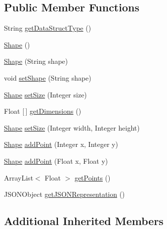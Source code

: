 \subsection*{Public Member Functions}
\begin{DoxyCompactItemize}
\item 
String \mbox{\hyperlink{classbridges_1_1base_1_1_shape_afedfd8c18cee9c257e97e674a7ee7280}{get\+Data\+Struct\+Type}} ()
\item 
\mbox{\hyperlink{classbridges_1_1base_1_1_shape_a36804934a06136baac463c026ad5ecfb}{Shape}} ()
\item 
\mbox{\hyperlink{classbridges_1_1base_1_1_shape_aede6772e9d9cb1b1c520a262d8fa53ed}{Shape}} (String shape)
\item 
void \mbox{\hyperlink{classbridges_1_1base_1_1_shape_aee070bfb54f51f7fe492f8a42ca6c052}{set\+Shape}} (String shape)
\item 
\mbox{\hyperlink{classbridges_1_1base_1_1_shape}{Shape}} \mbox{\hyperlink{classbridges_1_1base_1_1_shape_a0dcc8e3f9744b6b33da311fb477b7b9b}{set\+Size}} (Integer size)
\item 
Float \mbox{[}$\,$\mbox{]} \mbox{\hyperlink{classbridges_1_1base_1_1_shape_a1517f577eb32f162ddb0192e7bf3de9e}{get\+Dimensions}} ()
\item 
\mbox{\hyperlink{classbridges_1_1base_1_1_shape}{Shape}} \mbox{\hyperlink{classbridges_1_1base_1_1_shape_ac3a5ab9d24a4ee87b5a5b4c7a96f0f3e}{set\+Size}} (Integer width, Integer height)
\item 
\mbox{\hyperlink{classbridges_1_1base_1_1_shape}{Shape}} \mbox{\hyperlink{classbridges_1_1base_1_1_shape_afe4a23eae49cf672bd38601b013c1050}{add\+Point}} (Integer x, Integer y)
\item 
\mbox{\hyperlink{classbridges_1_1base_1_1_shape}{Shape}} \mbox{\hyperlink{classbridges_1_1base_1_1_shape_a72373b69d26f2a682269b273cd91f41a}{add\+Point}} (Float x, Float y)
\item 
Array\+List$<$ Float $>$ \mbox{\hyperlink{classbridges_1_1base_1_1_shape_ad8addc2d4ba18e1818648b8992ef1a0c}{get\+Points}} ()
\item 
J\+S\+O\+N\+Object \mbox{\hyperlink{classbridges_1_1base_1_1_shape_a0825361728503d29732b75d6344563d5}{get\+J\+S\+O\+N\+Representation}} ()
\end{DoxyCompactItemize}
\subsection*{Additional Inherited Members}


